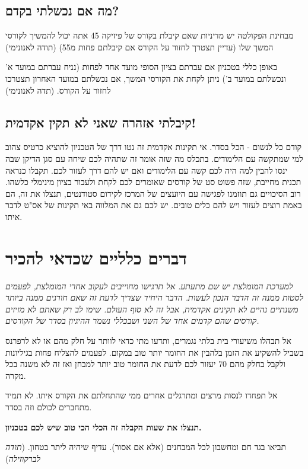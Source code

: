 \documentclass[a4paper,12pt]{article}
\begin{document}
\subsection{מה אם נכשלתי בקדם?}

מבחינת הפקולטה יש מדיניות שאם קיבלת בקורס של פיזיקה 45 אתה יכול להמשיך לקורסי המשך שלו (עדיין תצטרך לחזור על הקורס אם קיבלתם פחות מ55) (תודה לאנונימי)

באופן כללי בטכניון אם עברתם בציון הסופי מועד אחד לפחות (נניח עברתם במועד א' ונכשלתם במועד ב') ניתן לקחת את הקורסי המשך, אם נכשלתם במועד האחרון תצטרכו לחזור על הקורס. (תדה לאנונימי)

\subsection{קיבלתי אזהרה שאני לא תקין אקדמית!}

קודם כל לנשום - הכל בסדר. אי תקינות אקדמית זה נטו דרך של הטכניון להוציא כרטיס צהוב למי שמתקשה עם הלימודים. בתכלס מה שזה אומר זה שתהיה לכם שיחה עם סגן הדיקן שבה ינסו להבין למה היה לכם קשה עם הלימודים ואם יש להם דרך לעזור לכם. תקבלו כנראה תכנית מחייבת, שזה פשוט סט של קורסים שאומרים לכם לקחת ולעבור בציון מינימלי כלשהו. רוב הסיכויים גם תוזמנו לפגישה עם היועצים של המרכז לקידום סטודנטים, תנצלו את זה, הם באמת רוצים לעזור ויש להם כלים טובים. יש לכם גם את המלווה באי תקינות של אס"ט לדבר איתו.

\section{דברים כלליים שכדאי להכיר}

\emph{למערכת המומלצת יש שם מתעתע. אל תרגישו מחוייבים לעקוב אחרי המומלצת, לפעמים לסטות ממנה זה הדבר הנכון לעשות. הדבר היחיד שצריך לדעת זה שאם חורגים ממנה ביותר משנתיים נהיים לא תקינים אקדמית, אבל זה לא סוף העולם. שימו לב רק שאתם לא מזיזים קורסים שהם קדמים אחד של השני ושבכללי נשמר ההיגיון בסדר של הקורסים.}

אל תבהלו משיעורי בית בלתי נגמרים, ותדעו מתי כדאי לוותר על חלק מהם או לא לרפרנס בשביל להשקיע את הזמן בלהבין את החומר יותר טוב במקום. לפעמים להצליח פחות בגיליונות ולקבל בחלק מהם 70 יעזור לכם לדעת את החומר טוב יותר למבחן ואז זה לא משנה בכל מקרה.

אל תפחדו לנסות מרצים ומתרגלים אחרים ממי שהתחלתם את הקורס איתו. לא תמיד מתחברים לכולם וזה בסדר.

\textbf{תנצלו את שעות הקבלה זה הכלי הכי טוב שיש לכם בטכניון.}

תביאו בגד חם ומחשבון לכל המבחנים (אלא אם אסור). עדיף שיהיה ליתר בטחון. (\emph{תודה לברקוזילה})
\end{document}
